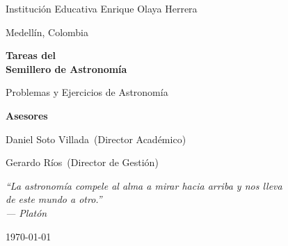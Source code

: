 \documentclass[12pt,oneside]{book}
\newcommand{\Institucion}{Institución Educativa Enrique Olaya Herrera}
\newcommand{\Ciudad}{Medellín, Colombia}
\newcommand{\AsesorPrincipal}{Daniel Soto Villada}
\newcommand{\CoAsesor}{Gerardo Ríos}
\newcommand{\TituloDocumento}{Tareas del\\[0.4em]Semillero de Astronomía}
\begin{document}
\hypersetup{pageanchor=false}

\begin{titlepage}
    \centering
    \vspace*{1.5cm}

    {\Large\textcolor{grisSec}{\Institucion}\par}
    \vspace{0.2cm}
    {\large\textcolor{grisSec}{\Ciudad}\par}

    \vspace{2.0cm}

    {\Huge\bfseries\textcolor{azulCosmos}{\TituloDocumento}\par}
    \vspace{0.5cm}
    {\Large\textcolor{grisSec}{Problemas y Ejercicios de Astronomía}\par}

    \vspace{2.4cm}

    \begin{tcolorbox}[
        colback=grisClaro,
        colframe=azulCosmos,
        boxrule=0.9pt,
        arc=2mm,
        width=0.82\textwidth
    ]
        \centering
        {\large\bfseries\textcolor{azulCosmos}{Asesores}\par}
        \vspace{0.3cm}
        {\large \AsesorPrincipal\ \textcolor{grisSec}{(Director Académico)}\par}
        \vspace{0.1cm}
        {\large \CoAsesor\ \textcolor{grisSec}{(Director de Gestión)}\par}
    \end{tcolorbox}

    \vspace{1.6cm}

    \begin{tcolorbox}[
        colback=colorIdea,
        colframe=doradoEstrella,
        boxrule=0.7pt,
        arc=2mm,
        width=0.82\textwidth
    ]
        \centering
        \itshape\large\textcolor{grisTexto}{%
        ``La astronomía compele al alma a mirar hacia arriba y nos lleva\\
        de este mundo a otro.''}\\[0.4em]
        \normalsize\textcolor{grisSec}{--- Platón}
    \end{tcolorbox}

    \vfill
    {\large\textcolor{grisSec}{\today}\par}
    \vspace{0.5cm}
\end{titlepage}
\end{document}
